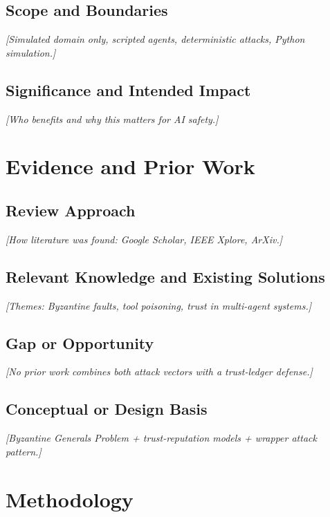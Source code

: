 \documentclass[a4paper, 11pt]{article}
\begin{document}
\subsection{Scope and Boundaries}
\textit{[Simulated domain only, scripted agents, deterministic attacks, Python simulation.]}

\subsection{Significance and Intended Impact}
\textit{[Who benefits and why this matters for AI safety.]}

\newpage

\section{Evidence and Prior Work}

\subsection{Review Approach}
\textit{[How literature was found: Google Scholar, IEEE Xplore, ArXiv.]}

\subsection{Relevant Knowledge and Existing Solutions}
\textit{[Themes: Byzantine faults, tool poisoning, trust in multi-agent systems.]}

\subsection{Gap or Opportunity}
\textit{[No prior work combines both attack vectors with a trust-ledger defense.]}

\subsection{Conceptual or Design Basis}
\textit{[Byzantine Generals Problem + trust-reputation models + wrapper attack pattern.]}

\newpage

\section{Methodology}
\end{document}
